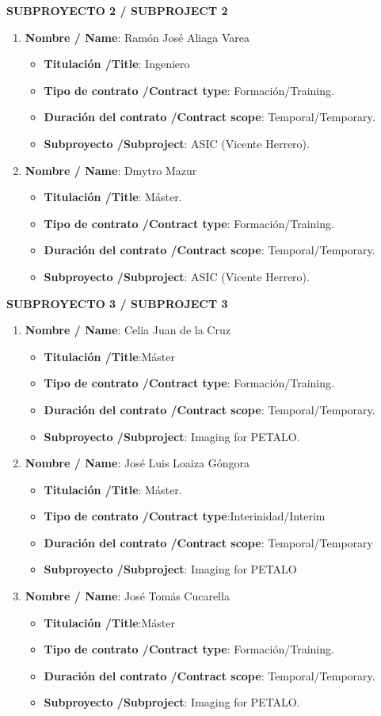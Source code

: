 
\noindent\textbf{SUBPROYECTO 2 / SUBPROJECT 2}
\begin{enumerate}
\item {\bf Nombre / Name}: Ramón José Aliaga Varea
\begin{itemize}
\item {\bf Titulación /Title}:  Ingeniero
\item {\bf Tipo de contrato /Contract type}: Formación/Training. 
\item {\bf Duración del contrato /Contract scope}: Temporal/Temporary. 
\item {\bf Subproyecto /Subproject}: ASIC (Vicente Herrero). 
\end{itemize}
\item {\bf Nombre / Name}: Dmytro Mazur
\begin{itemize}
\item {\bf Titulación /Title}: Máster. 
\item {\bf Tipo de contrato /Contract type}: Formación/Training. 
\item {\bf Duración del contrato /Contract scope}: Temporal/Temporary. 
\item {\bf Subproyecto /Subproject}: ASIC (Vicente Herrero). 
\end{itemize}
\end{enumerate}

\noindent\textbf{SUBPROYECTO 3 / SUBPROJECT 3}
\begin{enumerate}
 \item {\bf Nombre / Name}: Celia Juan de la Cruz
 \begin{itemize}
 \item {\bf Titulación /Title}:Máster
 \item {\bf Tipo de contrato /Contract type}: Formación/Training.
 \item {\bf Duración del contrato /Contract scope}: Temporal/Temporary.
 \item {\bf Subproyecto /Subproject}: Imaging for PETALO.
 \end{itemize}
 \item {\bf Nombre / Name}: José Luis Loaiza Góngora
 \begin{itemize}
 \item {\bf Titulación /Title}: Máster.
 \item {\bf Tipo de contrato /Contract type}:Interinidad/Interim
 \item {\bf Duración del contrato /Contract scope}: Temporal/Temporary
\item {\bf Subproyecto /Subproject}: Imaging for PETALO
 \end{itemize}
 \item {\bf Nombre / Name}: José Tomás Cucarella
 \begin{itemize}
 \item {\bf Titulación /Title}:Máster
 \item {\bf Tipo de contrato /Contract type}: Formación/Training.
 \item {\bf Duración del contrato /Contract scope}: Temporal/Temporary.
 \item {\bf Subproyecto /Subproject}: Imaging for PETALO.
 \end{itemize}
 \end{enumerate}
